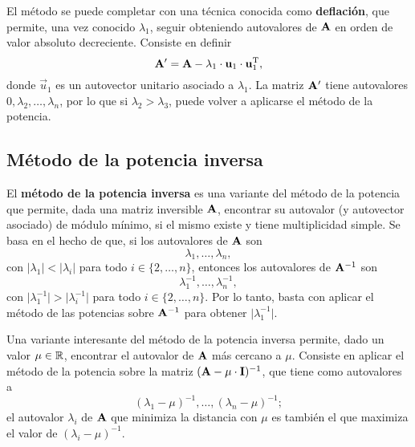 El método se puede completar con una técnica conocida como \textbf{deflación},
que permite, una vez conocido $\lambda_1$, seguir obteniendo autovalores de
$\mathbf{A}$ en orden de valor absoluto decreciente. Consiste en definir
\[\mathbf{A'} = \mathbf{A} - \lambda_1 \cdot \mathbf{u}_1 \cdot \mathbf{u}_1^{\mathrm{T}}, \]
donde $\vec{u}_1$ es un autovector unitario asociado a $\lambda_1$.
La matriz $\mathbf{A'}$ tiene autovalores $0, \lambda_2, \dots, \lambda_n$,
por lo que si $\lambda_2 > \lambda_3$, puede volver a aplicarse el método de
la potencia.


\subsection{Método de la potencia inversa}
El \textbf{método de la potencia inversa} es una variante del método de la
potencia que permite, dada una matriz inversible $\mathbf{A}$, encontrar su
autovalor (y autovector asociado) de módulo mínimo, si el mismo existe y
tiene multiplicidad simple.
Se basa en el hecho de que, si los autovalores de $\mathbf{A}$ son 
\[ \lambda_1, \dots, \lambda_n, \]
con $\lvert \lambda_1 \rvert < \lvert \lambda_i \rvert$ para todo $i \in
\{2,\dots,n\}$, entonces los autovalores de $\mathbf{A}^{-1}$ son
\[ \lambda_1^{-1}, \dots, \lambda_n^{-1}, \]
con $\lvert \lambda_1^{-1} \rvert > \lvert \lambda_i^{-1} \rvert$
para todo $i \in \{2,\dots,n\}$.
Por lo tanto, basta con aplicar el método de las potencias sobre
$\mathbf{A}^{-1}$ para obtener $\lvert \lambda_1^{-1} \rvert$.

Una variante interesante del método de la potencia inversa permite, dado un
valor $\mu \in \mathbb{R}$, encontrar el autovalor de $\mathbf{A}$ más cercano a
$\mu$. Consiste en aplicar el método de la potencia sobre la matriz $(\mathbf{A}
- \mu \cdot \mathbf{I})^{-1}$, que tiene como autovalores a
\[ (\lambda_1 - \mu)^{-1}, \dots, (\lambda_n - \mu)^{-1}; \]
el autovalor $\lambda_i$ de $\mathbf{A}$ que minimiza la distancia con $\mu$ es
también el que maximiza el valor de $(\lambda_i - \mu)^{-1}$.


